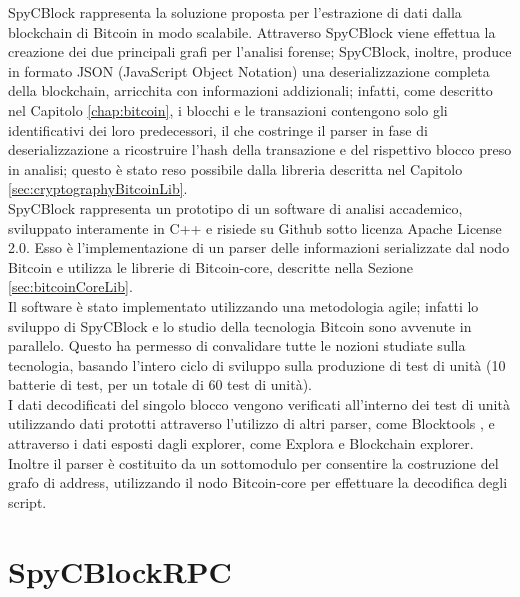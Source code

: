 SpyCBlock rappresenta la soluzione proposta per l'estrazione di dati dalla blockchain di Bitcoin in modo scalabile. Attraverso SpyCBlock viene effettua la creazione dei due principali grafi per l'analisi forense; SpyCBlock, inoltre, produce in formato JSON (JavaScript Object Notation) una deserializzazione completa della blockchain, arricchita con informazioni addizionali; infatti, come descritto nel Capitolo \ref{chap:bitcoin}, i blocchi e le transazioni contengono solo gli identificativi dei loro predecessori, il che costringe il parser in fase di deserializzazione a ricostruire l'hash della transazione e del rispettivo blocco preso in analisi; questo è stato reso possibile dalla libreria  descritta nel Capitolo \ref{sec:cryptographyBitcoinLib}.\\
SpyCBlock rappresenta un prototipo di un software di analisi accademico, sviluppato interamente in C++ e risiede su Github sotto licenza Apache License 2.0. Esso è l'implementazione di un parser delle informazioni serializzate dal nodo Bitcoin e utilizza le librerie di Bitcoin-core, descritte nella Sezione \ref{sec:bitcoinCoreLib}.\\
Il software è stato implementato utilizzando una metodologia agile; infatti lo sviluppo di SpyCBlock e lo studio della tecnologia Bitcoin sono avvenute in parallelo. Questo ha permesso di convalidare tutte le nozioni studiate sulla tecnologia, basando l'intero ciclo di sviluppo sulla produzione di test di unità (10 batterie di test, per un totale di 60 test di unità).\\
I dati decodificati del singolo blocco vengono verificati all'interno dei test di unità utilizzando dati prototti attraverso l'utilizzo di altri parser, come Blocktools \cite{parser:blocktools}, e attraverso i dati esposti dagli explorer, come Explora \cite{blockstream:esplora} e Blockchain explorer\cite{blockchain:explorer}.\\
Inoltre il parser è costituito da un sottomodulo per consentire la costruzione del grafo di address, utilizzando il nodo Bitcoin-core per effettuare la decodifica degli script.

\section{SpyCBlockRPC} \label{sec:spycblockrpc}

